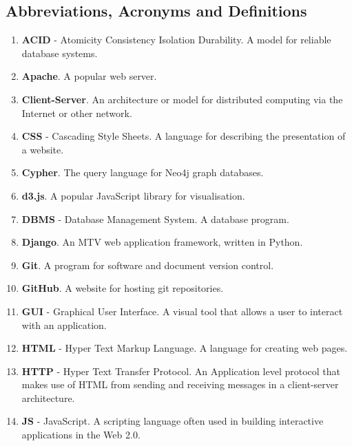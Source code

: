\documentclass[12pt,onecolumn]{article}
\begin{document}
	\subsection{Abbreviations, Acronyms and Definitions} %
	
	\begin{enumerate}
		\item \textbf{ACID} - Atomicity Consistency Isolation Durability. A model for reliable database systems.
		
		\item \textbf{Apache}. A popular web server.
		
		\item \textbf{Client-Server}. An architecture or model for distributed computing via the Internet or other network.
		
		\item \textbf{CSS} - Cascading Style Sheets. A language for describing the presentation of a website.
		
		\item \textbf{Cypher}. The query language for Neo4j graph databases.
		
		\item \textbf{d3.js}. A popular JavaScript library for visualisation.
		
		\item \textbf{DBMS} - Database Management System. A database program.
		
		\item \textbf{Django}. An MTV web application framework, written in Python.
		
		\item \textbf{Git}. A program for software and document version control.
		
		\item \textbf{GitHub}. A website for hosting git repositories.
		
		\item \textbf{GUI} - Graphical User Interface. A visual tool that allows a user to interact with an application.
		
		\item \textbf{HTML} - Hyper Text Markup Language. A language for creating web pages.
		
		\item \textbf{HTTP} - Hyper Text Transfer Protocol. An Application level protocol that makes use of HTML from sending and receiving messages in a client-server architecture.
		
		\item \textbf{JS} - JavaScript. A scripting language often used in building interactive applications in the Web 2.0.
		

\end{enumerate}
\end{document}
